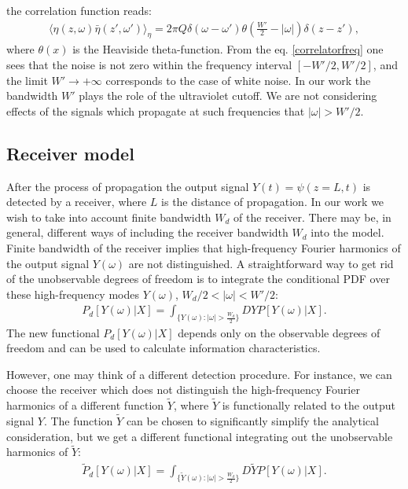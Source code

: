 \documentclass{article}
\begin{document}
the correlation function reads: 
\begin{eqnarray}\label{correlatorfreq}
    \langle\eta(z,\omega)\bar{\eta}(z',\omega') \rangle_{\eta} = 2\pi Q\delta(\omega - \omega') \theta\left(\frac{W'}{2}-|\omega|\right)\delta(z-z'),
\end{eqnarray}
where $\theta(x)$ is the Heaviside theta-function. From the eq. \eqref{correlatorfreq} one sees that the noise is not zero within the frequency interval $\left[-W'/2,W'/2\right]$, and the limit $W' \rightarrow +\infty$ corresponds to the case of white noise. In our work the bandwidth $W'$ plays the role of the ultraviolet cutoff. We are not considering effects of the signals which propagate at such frequencies that $|\omega|>W'/2$.

\subsection{Receiver model}
After the process of propagation the output signal $Y(t) = \psi(z=L,t)$ is detected by a receiver, where $L$ is the distance of propagation. In our work we wish to take into account finite bandwidth $W_{d}$ of the receiver. There may be, in general, different ways of including the receiver bandwidth $W_{d}$ into the model. Finite bandwidth of the receiver implies that high-frequency Fourier harmonics of the output signal $Y(\omega)$ are not distinguished. A straightforward way to get rid of the unobservable degrees of freedom is to integrate the conditional PDF over these high-frequency modes $Y(\omega)$, $W_{d}/2<|\omega|<W'/2$:
\begin{eqnarray}\label{P_domega}
    P_{d}[Y(\omega)|X] = \int_{\{Y(\omega) : |\omega| > \frac{W_{d}}{2}\}} DY P[Y(\omega)|X].
\end{eqnarray}
The new functional $P_{d}[Y(\omega)|X]$ depends only on the observable degrees of freedom and can be used to calculate information characteristics. 

However, one may think of a different detection procedure. For instance, we can choose the receiver  which does not distinguish the high-frequency Fourier harmonics of a different function $\tilde{Y}$, where $\tilde{Y}$ is functionally related to the output signal $Y$. The function $\tilde{Y}$ can be chosen to significantly simplify the analytical consideration, but we get a different functional integrating out the unobservable harmonics of $\tilde{Y}$:
\begin{eqnarray}\label{P_domegatilde}
    \tilde{P}_{d}[Y(\omega)|X] = \int_{\{\tilde{Y}(\omega) : |\omega| > \frac{W_{d}}{2}\}} D\tilde{Y} P[Y(\omega)|X].
\end{eqnarray}
\end{document}
